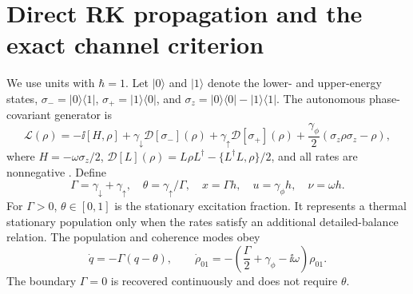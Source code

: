 \section{Direct RK propagation and the exact channel criterion}
\label{sec:criterion}

We use units with $\hbar=1$. Let $|0\rangle$ and $|1\rangle$ denote the lower- and upper-energy states, $\sigma_-=|0\rangle\langle1|$, $\sigma_+=|1\rangle\langle0|$, and $\sigma_z=|0\rangle\langle0|-|1\rangle\langle1|$. The autonomous phase-covariant generator is
\begin{equation}
 \mathcal L(\rho)=-\ii[H,\rho]+\gamma_\downarrow\mathcal D[\sigma_-](\rho)
 +\gamma_\uparrow\mathcal D[\sigma_+](\rho)
 +\frac{\gamma_\phi}{2}(\sigma_z\rho\sigma_z-\rho),
 \label{eq:gksl}
\end{equation}
where $H=-\omega\sigma_z/2$, $\mathcal D[L](\rho)=L\rho L^\dagger-\{L^\dagger L,\rho\}/2$, and all rates are nonnegative \cite{Hall2008Complete,Lankinen2016Complete,Filippov2020Phase,Siudzinska2023Geometry}. Define
\begin{equation}
 \Gamma=\gamma_\downarrow+\gamma_\uparrow,
 \quad \theta=\gamma_\uparrow/\Gamma,
 \quad x=\Gamma h,
 \quad u=\gamma_\phi h,
 \quad \nu=\omega h.
 \label{eq:coordinates}
\end{equation}
For $\Gamma>0$, $\theta\in[0,1]$ is the stationary excitation fraction. It represents a thermal stationary population only when the rates satisfy an additional detailed-balance relation. The population and coherence modes obey
\begin{equation}
 \dot q=-\Gamma(q-\theta),
 \qquad
 \dot\rho_{01}=-\left(\frac{\Gamma}{2}+\gamma_\phi-\ii\omega\right)\rho_{01}.
 \label{eq:modes}
\end{equation}
The boundary $\Gamma=0$ is recovered continuously and does not require $\theta$.


